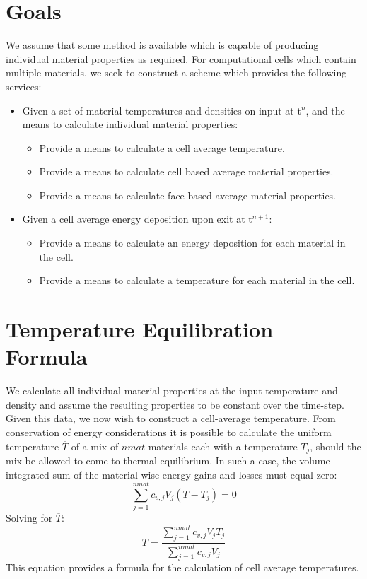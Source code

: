\documentclass[12pt]{article}
\begin{document}
\section{Goals}


We assume that some method is available which is capable of producing
individual material properties as required. 
For computational cells which contain multiple materials,
we seek to construct a scheme which provides the following services:
\begin{itemize}
 \item Given a set of material temperatures and densities on input at t$^n$,
       and the means to calculate individual material properties:
 \begin{itemize}
   \item Provide a means to calculate a cell average temperature.
   \item Provide a means to calculate cell based average material properties.
   \item Provide a means to calculate face based average material
	 properties.
 \end{itemize}
\item Given a cell average energy deposition  upon exit at t$^{n+1}$:
\begin{itemize} 
  \item Provide a means to calculate an  energy deposition for each
        material in the cell.
  \item Provide a means to calculate a temperature for each material in 
        the cell.
\end{itemize}
\end{itemize}



\section{Temperature Equilibration Formula}

We calculate all individual material properties at the input
temperature and density and assume the resulting properties to be constant 
over the time-step.  Given this data, we now wish to construct
a cell-average temperature.
From conservation of energy considerations it is possible to calculate
the uniform temperature $\overline{T}$ of a mix of $nmat$ materials 
each with a temperature $T_j$, should
the mix be allowed to come to thermal equilibrium.
In such a case, the volume-integrated sum of the material-wise 
energy gains and losses must equal zero:
\begin{equation}
\sum_{j=1}^{nmat} c_{v,j} V_{j} (\overline{T}-T_{j}) = 0
\end{equation}
Solving for $\overline{T}$:
\begin{equation}
\overline{T} = \frac{\sum_{j=1}^{nmat}c_{v,j}V_{j}T_{j}}
	{\sum_{j=1}^{nmat}c_{v,j}V_{j}}
\label{eq:tbar}
\end{equation}
This equation provides a formula for the calculation of 
cell average temperatures. 
\end{document}

